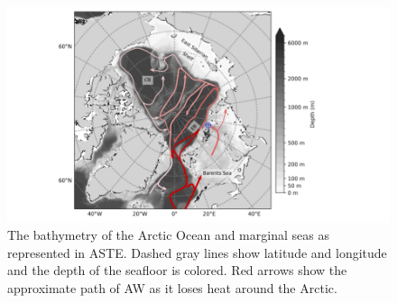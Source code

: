\documentclass[draft]{agujournal2019}
\begin{document}
\begin{figure}
    \includegraphics[width=\linewidth]{figs/Arctic_bathymetry.png}
    \vspace{-5pt} %
    \caption{The bathymetry of the Arctic Ocean and marginal seas as represented in ASTE. Dashed gray lines show latitude and longitude and the depth of the seafloor is colored. Red arrows show the approximate path of AW as it loses heat around the Arctic.}
    \label{fig:wholeArctic}
\end{figure}
\end{document}
